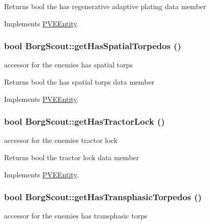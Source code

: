 \begin{DoxyReturn}{Returns}
bool the has regenerative adaptive plating data member 
\end{DoxyReturn}


Implements \hyperlink{classPVEEntity}{PVEEntity}.

\hypertarget{classBorgScout_aed0c2eadce9f7ecc0278ccbd139fc795}{
\subsubsection[{getHasSpatialTorpedos}]{\setlength{\rightskip}{0pt plus 5cm}bool BorgScout::getHasSpatialTorpedos ()}}
\label{d5/d8c/classBorgScout_aed0c2eadce9f7ecc0278ccbd139fc795}
accessor for the enemies has spatial torps

\begin{DoxyReturn}{Returns}
bool the has spatial torps data member 
\end{DoxyReturn}


Implements \hyperlink{classPVEEntity}{PVEEntity}.

\hypertarget{classBorgScout_ac6bc77f2e7232631646afb05b9f706ea}{
\subsubsection[{getHasTractorLock}]{\setlength{\rightskip}{0pt plus 5cm}bool BorgScout::getHasTractorLock ()}}
\label{d5/d8c/classBorgScout_ac6bc77f2e7232631646afb05b9f706ea}
accessor for the enemies tractor lock

\begin{DoxyReturn}{Returns}
bool the tractor lock data member 
\end{DoxyReturn}


Implements \hyperlink{classPVEEntity}{PVEEntity}.

\hypertarget{classBorgScout_a3504b9ab7146069cdda109582f177329}{
\subsubsection[{getHasTransphasicTorpedos}]{\setlength{\rightskip}{0pt plus 5cm}bool BorgScout::getHasTransphasicTorpedos ()}}
\label{d5/d8c/classBorgScout_a3504b9ab7146069cdda109582f177329}
accessor for the enemies has transphasic torps

